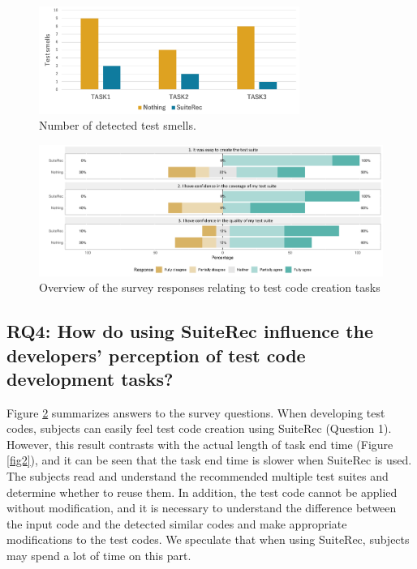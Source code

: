 \documentclass[conference]{IEEEtran}
\begin{document}
\begin{figure}[htbp]
\centerline{\includegraphics[width=8.5cm]{smells.pdf}}
\caption{Number of detected test smells.}
\label{fig8}
\end{figure}

\begin{figure}[t]
 \begin{center}
  \includegraphics[width=18.5cm]{qa.pdf}
  \caption{Overview of the survey responses relating to test code creation tasks}
  \label{fig9}
 \end{center}
\end{figure}

\subsection{RQ4: How do using SuiteRec influence the developers’ perception of test code development tasks?}

Figure \ref{fig9} summarizes answers to the survey questions. When developing test codes, subjects can easily feel test code creation using SuiteRec (Question 1). However, this result contrasts with the actual length of task end time (Figure \ref{fig2}), and it can be seen that the task end time is slower when SuiteRec is used. The subjects read and understand the recommended multiple test suites and determine whether to reuse them. In addition, the test code cannot be applied without modification, and it is necessary to understand the difference between the input code and the detected similar codes and make appropriate modifications to the test codes. We speculate that when using SuiteRec, subjects may spend a lot of time on this part. 
\end{document}

